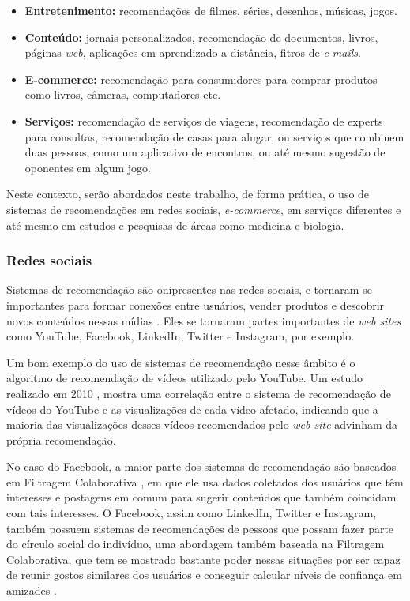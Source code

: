 \documentclass[
	12pt,				%
	a4paper,			%
	english,			%
	french,				%
	spanish,			%
	brazil				%
	]{abntex2}
\begin{document}
\begin{itemize}
    \item \textbf{Entretenimento:} recomendações de filmes, séries, desenhos, músicas, jogos.
    \item \textbf{Conteúdo:} jornais personalizados, recomendação de documentos, livros, páginas \emph{web}, aplicações em aprendizado a distância, fitros de \emph{e-mails}.
    \item \textbf{E-commerce:} recomendação para consumidores para comprar produtos como livros, câmeras, computadores etc.
    \item \textbf{Serviços:} recomendação de serviços de viagens, recomendação de experts para consultas, recomendação de casas para alugar, ou serviços que combinem duas pessoas, como um aplicativo de encontros, ou até mesmo sugestão de oponentes em algum jogo.
\end{itemize}

Neste contexto, serão abordados neste trabalho, de forma prática, o uso de sistemas de recomendações em redes sociais, \emph{e-commerce}, em serviços diferentes e até mesmo em estudos e pesquisas de áreas como medicina e biologia.

\subsubsection{Redes sociais}

Sistemas de recomendação são onipresentes nas redes sociais, e tornaram-se importantes para formar conexões entre usuários, vender produtos e descobrir novos conteúdos nessas mídias \cite{burke2007hybrid}. Eles se tornaram partes importantes de \emph{web sites} como YouTube, Facebook, LinkedIn, Twitter e Instagram, por exemplo.

Um bom exemplo do uso de sistemas de recomendação nesse âmbito é o algoritmo de recomendação de vídeos utilizado pelo YouTube. Um estudo realizado em 2010 \cite{zhou2010impact}, mostra uma correlação entre o sistema de recomendação de vídeos do YouTube e as visualizações de cada vídeo afetado, indicando que a maioria das visualizações desses vídeos recomendados pelo \emph{web site} advinham da própria recomendação.

No caso do Facebook, a maior parte dos sistemas de recomendação são baseados em Filtragem Colaborativa \cite{shapira2013facebook}, em que ele usa dados coletados dos usuários que têm interesses e postagens em comum para sugerir conteúdos que também coincidam com tais interesses. O Facebook, assim como LinkedIn, Twitter e Instagram, também possuem sistemas de recomendações de pessoas que possam fazer parte do círculo social do indivíduo, uma abordagem também baseada na Filtragem Colaborativa, que tem se mostrado bastante poder nessas situações por ser capaz de reunir gostos similares dos usuários e conseguir calcular níveis de confiança em amizades \cite{chen2010social}.
\end{document}
